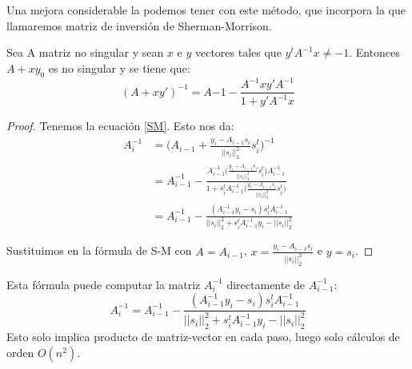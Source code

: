 Una mejora considerable la podemos tener con este método, que incorpora la que llamaremos matriz de inversión de Sherman-Morrison.

\begin{theorem}
	Sea A matriz no singular y sean $x$ e $y$ vectores tales que $y^t A^{-1}x \neq -1$. Entonces $A + x y_0$ es no singular y se tiene que:
	\[(A + xy')^{-1} = A{-1} - \frac{A^{-1}xy'A^{-1}}{1+y'A^{-1}x}\]
\end{theorem}

\begin{proof}

	Tenemos la ecuación \ref{SM}. Esto nos da:
	\begin{align*}
		A^{-1}_i &= 
		\Big( A_{i-1} + \frac{y_{i} - A_{i-1} s_{i}}{||s_{i}||_2^2} s_{i}^t \Big)^{-1} \\
		 &= A_{i-1}^{-1} - \frac{A_{i-1}^{-1} \Big( \frac{y_{i} - A_{i-1} s_{i}}{||s_{i}||_2^2} s_{i}^t  \Big) A_{i-1}^{-1} }{  1 + s_{i}^{t}A_{i-1}^{-1} \Big( \frac{y_{i} - A_{i-1} s_{i}}{||s_{i}||_2^2} s_{i}^t  \Big) } \\
		 &= A_{i-1}^{-1} - \frac{(	A_{i-1}^{-1} y_{i} - s_{i}) s_{i}^{t} 	A_{i-1}^{-1}  }{ ||s_{i}||_2^2 + s_{i}^{t} A_{i-1}^{-1} y_{i} - ||s_{i}||_2^2 }
	\end{align*}

	Sustituimos en la fórmula de S-M con
	$A = A_{i-1}$, $ x = \frac{y_i - A_{i-1}s_{i}}{||s_i||_2^2}$ e $y = s_{i}$.
	
\end{proof}

Esta fórmula puede computar la matriz $A^{-1}_i$ directamente de $A^{-1}_{i-1}$:
\[A^{-1}_i = A_{i-1}^{-1} - \frac{(	A_{i-1}^{-1} y_{i} - s_{i}) s_{i}^{t} 	A_{i-1}^{-1}  }{ ||s_{i}||_2^2 + s_{i}^{t} A_{i-1}^{-1} y_{i} - ||s_{i}||_2^2 } \]
Esto solo implica producto de matriz-vector en cada paso, luego solo cálculos de orden $O(n^2)$.


